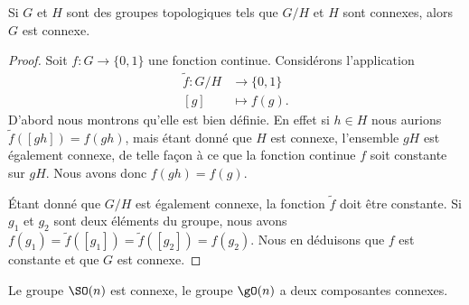 \begin{lemma}       \label{LemkLRAet}
    Si \( G\) et \( H\) sont des groupes topologiques tels que $G/H$ et \( H\) sont connexes, alors \( G\) est connexe.
\end{lemma}

\begin{proof}
    Soit \( f\colon G\to \{ 0,1 \}\) une fonction continue. Considérons l'application
    \begin{equation}
        \begin{aligned}
            \tilde f\colon G/H&\to \{ 0,1 \} \\
            [g]&\mapsto f(g). 
        \end{aligned}
    \end{equation}
    D'abord nous montrons qu'elle est bien définie. En effet si \( h\in H\) nous aurions \( \tilde f([gh])=f(gh)\), mais étant donné que \( H\) est connexe, l'ensemble \( gH\) est également connexe, de telle façon à ce que la fonction continue \( f\) soit constante sur \( gH\). Nous avons donc \( f(gh)=f(g)\).

    Étant donné que \( G/H\) est également connexe, la fonction \( \tilde f\) doit être constante. Si \( g_1\) et \( g_2\) sont deux éléments du groupe, nous avons \( f(g_1)=\tilde f([g_1])=\tilde f([g_2])=f(g_2)\). Nous en déduisons que \( f\) est constante et que \( G\) est connexe.
\end{proof}

\begin{theorem}
    Le groupe \( \SO(n)\) est connexe, le groupe \( \gO(n)\) a deux composantes connexes.
\end{theorem}

